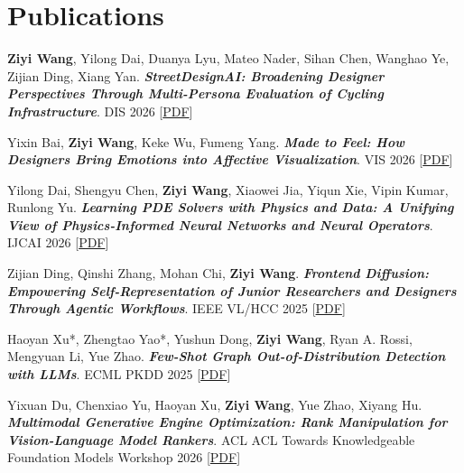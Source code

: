 \section{Publications}
\begin{enumerate}[leftmargin=0.35in, label={[\arabic*]}]

    \item \label{pub:streetdesignai} \small{\textbf{Ziyi Wang}, Yilong Dai, Duanya Lyu, Mateo Nader, Sihan Chen, Wanghao Ye, Zijian Ding, Xiang Yan. \textbf{\textit{StreetDesignAI: Broadening Designer Perspectives Through Multi-Persona Evaluation of Cycling Infrastructure}}. DIS 2026 [\href{https://dl.acm.org/doi/pdf/10.1145/3800645.3812888?__cf_chl_f_tk=EmkL72BYMUWI8ZpV2GWZkl3LFqqoL9Vey4_0ZHAOKs0-1782755398-1.0.1.1-QIrtVuysPtlBLlyf_SbK8FIn_gKL24ggoXbvx0NJKeg}{PDF}]}    

    \item \label{pub:streetdesignai} \small{Yixin Bai, \textbf{Ziyi Wang}, Keke Wu, Fumeng Yang. \textbf{\textit{Made to Feel: How Designers Bring Emotions into Affective Visualization}}. VIS 2026 [\href{https://drive.google.com/file/d/1ILvw8a8ZKOCGoUxMFjx8IRsTLjNgBypy/view?usp=drive_link}{PDF}]}    
    
    \item \label{pub:pde} \small{Yilong Dai, Shengyu Chen, \textbf{Ziyi Wang}, Xiaowei Jia, Yiqun Xie, Vipin Kumar, Runlong Yu. \textbf{\textit{Learning PDE Solvers with Physics and Data: A Unifying View of Physics-Informed Neural Networks and Neural Operators}}. IJCAI 2026 [\href{https://arxiv.org/pdf/2601.14517}{PDF}]}
    
    \item \label{pub:frontend} \small{Zijian Ding, Qinshi Zhang, Mohan Chi, \textbf{Ziyi Wang}. \textbf{\textit{Frontend Diffusion: Empowering Self-Representation of Junior Researchers and Designers Through Agentic Workflows}}. IEEE VL/HCC 2025 [\href{https://arxiv.org/pdf/2502.03788}{PDF}]}
    
    \item \label{pub:fewshot} \small{Haoyan Xu*, Zhengtao Yao*, Yushun Dong, \textbf{Ziyi Wang}, Ryan A. Rossi, Mengyuan Li, Yue Zhao. \textbf{\textit{Few-Shot Graph Out-of-Distribution Detection with LLMs}}. ECML PKDD 2025 [\href{https://arxiv.org/pdf/2503.22097}{PDF}]}

    \item \label{pub:mego} \small{Yixuan Du, Chenxiao Yu, Haoyan Xu, \textbf{Ziyi Wang}, Yue Zhao, Xiyang Hu. \textbf{\textit{Multimodal Generative Engine Optimization: Rank Manipulation for Vision-Language Model Rankers}}. ACL ACL Towards Knowledgeable Foundation Models Workshop 2026
    [\href{https://arxiv.org/pdf/2601.12263}{PDF}]}
    

\end{enumerate}
